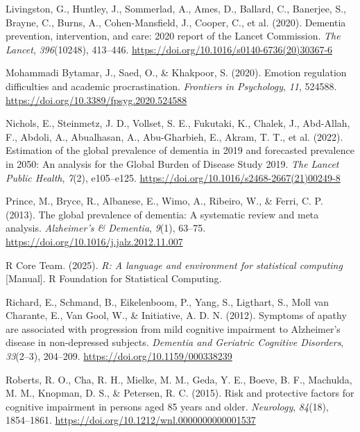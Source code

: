 \documentclass[
]{article}
\newlength{\cslhangindent}
\newenvironment{CSLReferences}[2] %
 {\begin{list}{}{%
  \setlength{\itemindent}{0pt}
  \setlength{\leftmargin}{0pt}
  \setlength{\parsep}{0pt}
  \ifodd #1
   \setlength{\leftmargin}{\cslhangindent}
   \setlength{\itemindent}{-1\cslhangindent}
  \fi
  \setlength{\itemsep}{#2\baselineskip}}}
 {\end{list}}
\begin{document}
\begin{CSLReferences}{1}{0}
Livingston, G., Huntley, J., Sommerlad, A., Ames, D., Ballard, C.,
Banerjee, S., Brayne, C., Burns, A., Cohen-Mansfield, J., Cooper, C., et
al. (2020). Dementia prevention, intervention, and care: 2020 report of
the {Lancet Commission}. \emph{The Lancet}, \emph{396}(10248), 413--446.
\url{https://doi.org/10.1016/s0140-6736(20)30367-6}

Mohammadi Bytamar, J., Saed, O., \& Khakpoor, S. (2020). Emotion
regulation difficulties and academic procrastination. \emph{Frontiers in
Psychology}, \emph{11}, 524588.
\url{https://doi.org/10.3389/fpsyg.2020.524588}

Nichols, E., Steinmetz, J. D., Vollset, S. E., Fukutaki, K., Chalek, J.,
Abd-Allah, F., Abdoli, A., Abualhasan, A., Abu-Gharbieh, E., Akram, T.
T., et al. (2022). Estimation of the global prevalence of dementia in
2019 and forecasted prevalence in 2050: An analysis for the {Global
Burden} of {Disease Study} 2019. \emph{The Lancet Public Health},
\emph{7}(2), e105--e125.
\url{https://doi.org/10.1016/s2468-2667(21)00249-8}

Prince, M., Bryce, R., Albanese, E., Wimo, A., Ribeiro, W., \& Ferri, C.
P. (2013). The global prevalence of dementia: {A} systematic review and
meta analysis. \emph{Alzheimer's \& Dementia}, \emph{9}(1), 63--75.
\url{https://doi.org/10.1016/j.jalz.2012.11.007}

R Core Team. (2025). \emph{R: A language and environment for statistical
computing} {[}Manual{]}. R Foundation for Statistical Computing.

Richard, E., Schmand, B., Eikelenboom, P., Yang, S., Ligthart, S., Moll
van Charante, E., Van Gool, W., \& Initiative, A. D. N. (2012). Symptoms
of apathy are associated with progression from mild cognitive impairment
to {Alzheimer}'s disease in non-depressed subjects. \emph{Dementia and
Geriatric Cognitive Disorders}, \emph{33}(2--3), 204--209.
\url{https://doi.org/10.1159/000338239}

Roberts, R. O., Cha, R. H., Mielke, M. M., Geda, Y. E., Boeve, B. F.,
Machulda, M. M., Knopman, D. S., \& Petersen, R. C. (2015). Risk and
protective factors for cognitive impairment in persons aged 85 years and
older. \emph{Neurology}, \emph{84}(18), 1854--1861.
\url{https://doi.org/10.1212/wnl.0000000000001537}


\end{CSLReferences}
\end{document}
